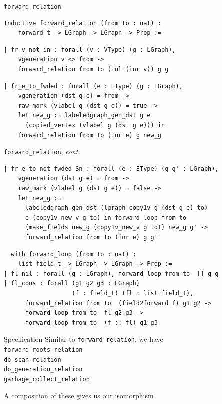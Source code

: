 \documentclass[usenames, xcolor=dvipsnames]{beamer}
\begin{document}
\begin{frame}[fragile]{\texttt{forward\_relation}}
\begin{Verbatim}
Inductive forward_relation (from to : nat) : 
    forward_t -> LGraph -> LGraph -> Prop :=
\end{Verbatim}
\pause
\begin{Verbatim}
| fr_v_not_in : forall (v : VType) (g : LGraph),
    vgeneration v <> from ->
    forward_relation from to (inl (inr v)) g g
\end{Verbatim}
\pause
\begin{Verbatim}
| fr_e_to_fwded : forall (e : EType) (g : LGraph),
    vgeneration (dst g e) = from ->
    raw_mark (vlabel g (dst g e)) = true ->
    let new_g := labeledgraph_gen_dst g e
      (copied_vertex (vlabel g (dst g e))) in
    forward_relation from to (inr e) g new_g
\end{Verbatim}
\end{frame}

\begin{frame}[fragile]{\texttt{forward\_relation}, \emph{cont.}}
\begin{Verbatim}
| fr_e_to_not_fwded_Sn : forall (e : EType) (g g' : LGraph), 
    vgeneration (dst g e) = from ->
    raw_mark (vlabel g (dst g e)) = false -> 
    let new_g :=
      labeledgraph_gen_dst (lgraph_copy1v g (dst g e) to)
      e (copy1v_new_v g to) in forward_loop from to
      (make_fields new_g (copy1v_new_v g to)) new_g g' ->
      forward_relation from to (inr e) g g'
\end{Verbatim} 
\pause
\begin{Verbatim}
  with forward_loop (from to : nat) : 
    list field_t -> LGraph -> LGraph -> Prop :=
| fl_nil : forall (g : LGraph), forward_loop from to  [] g g
| fl_cons : forall (g1 g2 g3 : LGraph) 
                   (f : field_t) (fl : list field_t),
      forward_relation from to  (field2forward f) g1 g2 ->
      forward_loop from to  fl g2 g3 ->
      forward_loop from to  (f :: fl) g1 g3
\end{Verbatim}
\end{frame}

\begin{frame}{Specification}
Similar to \texttt{forward\_relation}, we have
\\ \hspace{1em}\texttt{forward\_roots\_relation}
\\ \hspace{1em}\texttt{do\_scan\_relation}
\\ \hspace{1em}\texttt{do\_generation\_relation}
\\ \hspace{1em}\texttt{garbage\_collect\_relation}

\bigskip

\flushright \pause A composition of these gives us our \alert{isomorphism}
\end{frame}
\end{document}
